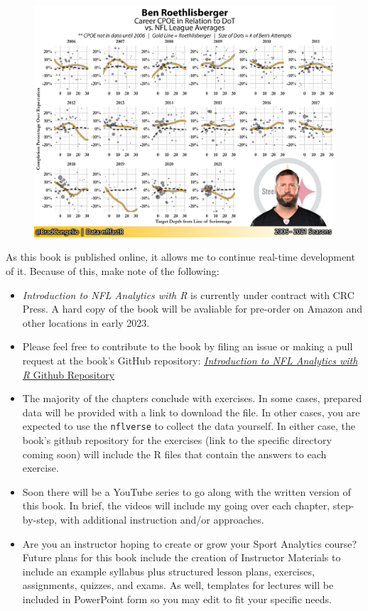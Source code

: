\documentclass[
  letterpaper,
]{krantz}
\begin{document}
\begin{figure}

{\centering \includegraphics{./images/big-ben-intro.jpg}

}

\end{figure}

As this book is published online, it allows me to continue real-time
development of it. Because of this, make note of the following:

\begin{itemize}
\item
  \emph{Introduction to NFL Analytics with R} is currently under
  contract with CRC Press. A hard copy of the book will be avaliable for
  pre-order on Amazon and other locations in early 2023.
\item
  Please feel free to contribute to the book by filing an issue or
  making a pull request at the book's GitHub repository:
  \href{https://github.com/bcongelio/nfl-analytics-with-r-book}{\emph{Introduction
  to NFL Analytics with R} Github Repository}
\item
  The majority of the chapters conclude with exercises. In some cases,
  prepared data will be provided with a link to download the file. In
  other cases, you are expected to use the \texttt{nflverse} to collect
  the data yourself. In either case, the book's github repository for
  the exercises (link to the specific directory coming soon) will
  include the R files that contain the answers to each exercise.
\item
  Soon there will be a YouTube series to go along with the written
  version of this book. In brief, the videos will include my going over
  each chapter, step-by-step, with additional instruction and/or
  approaches.
\item
  Are you an instructor hoping to create or grow your Sport Analytics
  course? Future plans for this book include the creation of Instructor
  Materials to include an example syllabus plus structured lesson plans,
  exercises, assignments, quizzes, and exams. As well, templates for
  lectures will be included in PowerPoint form so you may edit to fit
  your specific needs.
\end{itemize}
\end{document}
